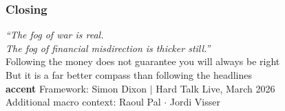 \begin{frame}[fragile]\frametitle{Closing}
  \begin{center}
    \large
    \textit{``The fog of war is real.}\\
    \textit{The fog of financial misdirection is thicker still.''}\\[1em]
    \normalsize
    Following the money does not guarantee you will always be right\\[0.3em]
    But it is a far better compass than following the headlines\\[1.5em]
    \textbf{accent} Framework: Simon Dixon $|$ Hard Talk Live, March 2026\\
    Additional macro context: Raoul Pal $\cdot$ Jordi Visser
  \end{center}
\end{frame}
